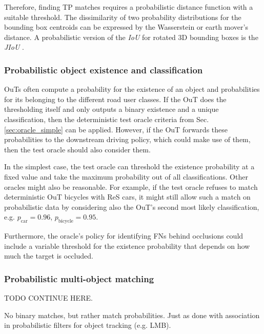 \documentclass[conference]{IEEEtran}
\begin{document}
Therefore, finding TP matches requires a probabilistic distance function with a suitable threshold. 
The dissimilarity of two probability distributions for the bounding box centroids can be expressed by the Wasserstein or earth mover's distance.
A probabilistic version of the \textit{IoU} for rotated 3D bounding boxes is the \textit{JIoU} \cite{Wang2020inferring_iros}.

\subsubsection{Probabilistic object existence and classification}
\label{sec:prob_thresholding}

OuTs often compute a probability for the existence of an object and probabilities for its belonging to the different road user classes.
If the OuT does the thresholding itself and only outputs a binary existence and a unique classification, then the deterministic test oracle criteria from Sec. \ref{sec:oracle_simple} can be applied. 
However, if the OuT forwards these probabilities to the downstream driving policy, which could make use of them, then the test oracle should also consider them. 

In the simplest case, the test oracle can threshold the existence probability at a fixed value and take the maximum probability out of all classifications.
Other oracles might also be reasonable.
For example, if the test oracle refuses to match deterministic OuT bicycles with ReS cars, it might still allow such a match on probabilistic data by considering also the OuT's second most likely classification, e.g. $p_\text{car} = 0.96$, $p_\text{bicycle} = 0.95$.

Furthermore, the oracle's policy for identifying FNs behind occlusions could include a variable threshold for the existence probability that depends on how much the target is occluded.

\subsubsection{Probabilistic multi-object matching}
\label{sec:prob_matching}


TODO CONTINUE HERE.

No binary matches, but rather match probabilities. 
Just as done with association in probabilistic filters for object tracking (e.g. LMB). 
\end{document}
